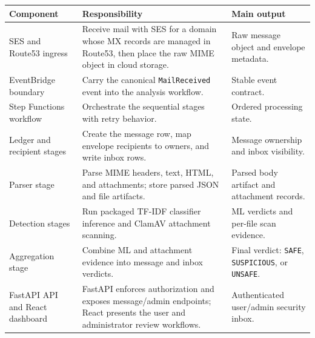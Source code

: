 \begin{table}[!htbp]
\centering
\small
\begin{tabular}{|>{\raggedright\arraybackslash}p{}|>{\raggedright\arraybackslash}p{}|>{\raggedright\arraybackslash}p{}|}
\hline
\textbf{Component} & \textbf{Responsibility} & \textbf{Main output} \\
\hline
SES and Route53 ingress & Receive mail with SES for a domain whose MX records are managed in Route53, then place the raw MIME object in cloud storage. & Raw message object and envelope metadata. \\
\hline
EventBridge boundary & Carry the canonical \texttt{MailReceived} event into the analysis workflow. & Stable event contract. \\
\hline
Step Functions workflow & Orchestrate the sequential stages with retry behavior. & Ordered processing state. \\
\hline
Ledger and recipient stages & Create the message row, map envelope recipients to owners, and write inbox rows. & Message ownership and inbox visibility. \\
\hline
Parser stage & Parse MIME headers, text, HTML, and attachments; store parsed JSON and file artifacts. & Parsed body artifact and attachment records. \\
\hline
Detection stages & Run packaged TF-IDF classifier inference and ClamAV attachment scanning. & ML verdicts and per-file scan evidence. \\
\hline
Aggregation stage & Combine ML and attachment evidence into message and inbox verdicts. & Final verdict: \texttt{SAFE}, \texttt{SUSPICIOUS}, or \texttt{UNSAFE}. \\
\hline
FastAPI API and React dashboard & FastAPI enforces authorization and exposes message/admin endpoints; React presents the user and administrator review workflows. & Authenticated user/admin security inbox. \\
\hline
\end{tabular}
\end{table}
